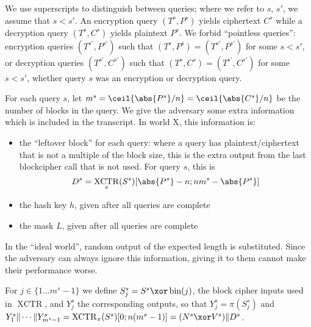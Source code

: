 \documentclass[letterpaper,11pt]{article}
\newcommand*{\Concat}{\Vert}
\DeclareMathOperator{\fromint}{bin}
\DeclareMathOperator{\XCTR}{XCTR}
\begin{document}
We use superscripts to distinguish between queries;
where we refer to \(s\), \(s'\), we assume that \(s < s'\).
An encryption query \((T^s, P^s)\) yields ciphertext \(C^s\)
while a decryption query \((T^s, C^s)\)
yields plaintext \(P^s\).
We forbid ``pointless queries'':
encryption queries \((T^{s'}, P^{s'})\)
such that \((T^s, P^s) = (T^{s'}, P^{s'})\) for some \(s < s'\), 
or decryption queries \((T^{s'}, C^{s'})\)
such that \((T^s, C^s) = (T^{s'}, C^{s'})\) for some \(s < s'\),
whether query \(s\) was an encryption or decryption query.

For each query \(s\), let \(m^s = \ceil{\abs{P^s}/n} = \ceil{\abs{C^s}/n}\)
be the number of blocks in the query.
We give the adversary some 
extra information
which is included in the transcript.
In world X, this information is:
\begin{itemize}
    \item the ``leftover block'' for each query:
    where a query has plaintext/ciphertext
    that is not a multiple of the block size,
    this is the extra output from the last
    blockcipher call that is not used.
    For query \(s\), this is 
    \begin{displaymath}
        D^s = \XCTR_\pi(S^s)[\abs{P^s} - n; nm^s-\abs{P^s}]
    \end{displaymath}
    \item the hash key \(h\), given after all queries are complete
    \item the mask \(L\), given after all queries are complete
\end{itemize}
In the ``ideal world'', random output of the expected
length is substituted. Since the adversary can always ignore
this information, giving it to them cannot make their performance worse.

For \(j \in \{1 \ldots m^s-1\}\) we define \(S_j^s = S^s \xor \fromint(j)\),
the block cipher inputs used in \(\XCTR\), and \(Y_j^s\) the corresponding
outputs, so that \(Y_j^s = \pi(S_j^s)\) and 
\(Y_1^s \Concat \cdots \Concat Y_{m^s-1}^s = \XCTR_\pi(S^s)[0;n(m^s -1)] 
= (N^s \xor V^s) \Concat D^s\).
\end{document}

